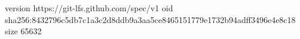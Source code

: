 version https://git-lfs.github.com/spec/v1
oid sha256:8432796c5db7c1a3c2d8ddb9a3aa5ce8465151779e1732b94adff3496e4e8c18
size 65632
